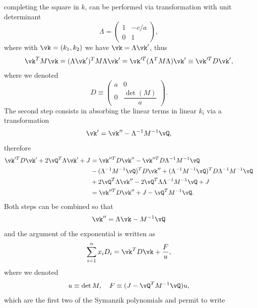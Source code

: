 completing the square in $k$, can be performed via transformation with unit determinant
\begin{equation}
    \Lambda = 
    \begin{pmatrix}
        1 & -c/a \\
        0 & 1
    \end{pmatrix},
\end{equation}
where with $\vk = (k_1,k_2)$ we have $\vk = \Lambda \vk'$, thus
\begin{equation}
    \vk^TM\vk = (\Lambda\vk')^TM\Lambda\vk' = \vk'^T(\Lambda^TM\Lambda)\vk'\equiv \vk'^TD\vk',
\end{equation}
where we denoted
\begin{equation}
    D \equiv 
    \begin{pmatrix}
        a & 0 \\
        0 & \dfrac{\det{(M)}}{a}
    \end{pmatrix}.
\end{equation}
The second step consists in absorbing the linear terms in linear $k_i$ via a transformation 
\begin{equation}
    \vk' = \vk'' - \Lambda^{-1}M^{-1}\vQ,
\end{equation}
therefore
\begin{equation}
    \begin{split}
        \vk'^TD\vk' + 2\vQ^T\Lambda\vk' + J &= \vk''^TD\vk'' - \vk''^TD\Lambda^{-1}M^{-1}\vQ \\
        &- (\Lambda^{-1}M^{-1}\vQ)^TD\vk'' + (\Lambda^{-1}M^{-1}\vQ)^TD\Lambda^{-1}M^{-1}\vQ \\
        &+ 2\vQ^T\Lambda\vk'' - 2\vQ^T\Lambda\Lambda^{-1}M^{-1}\vQ + J \\
        &= \vk''^TD\vk'' + J - \vQ^TM^{-1}\vQ.
    \end{split}
\end{equation}
Both steps can be combined so that
\begin{equation}
    \vk'' = \Lambda\vk - M^{-1}\vQ 
\end{equation}
and the argument of the exponential is written as
\begin{equation}
    \sum_{i=1}^nx_iD_i = \vk^TD\vk + \frac{F}{u},
\end{equation}
where we denoted
\begin{equation}
    u \equiv \det{M},\quad F \equiv (J - \vQ^TM^{-1}\vQ)u,
\end{equation}
which are the first two of the Symanzik polynomials and permit to write
